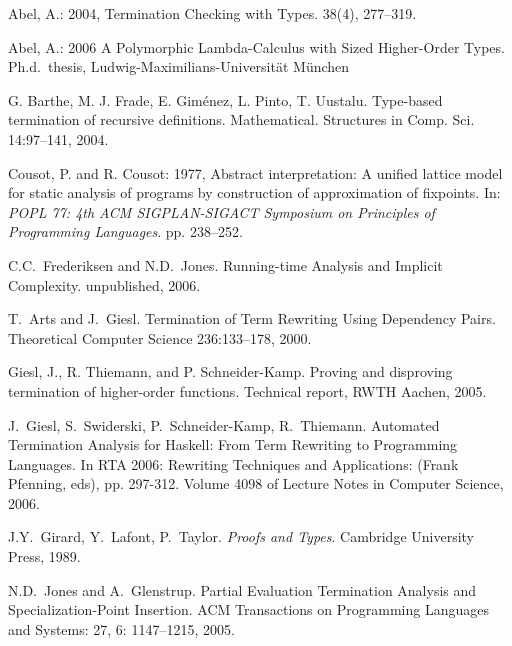 \documentclass{LMCS}
\theoremstyle{definition}\newtheorem{env}[thm]{Environment}
\begin{document}
\nocite{*}


\begin{thebibliography}{MMM}

Abel, A.: 2004, Termination Checking with Types.
 { 38}(4), 277--319.

Abel, A.: 2006 A Polymorphic Lambda-Calculus with Sized Higher-Order
		  Types.
\newblock Ph.d.\ thesis, Ludwig-Maximilians-Universit\"at M\"unchen



G. Barthe, M. J. Frade, E. Gim\'{e}nez, L. Pinto, T. Uustalu.
Type-based termination of recursive definitions. 
Mathematical. Structures in Comp. Sci. 14:97--141, 
2004. 

Cousot, P. and R. Cousot: 1977, Abstract interpretation: A unified lattice
  model for static analysis of programs by construction of approximation of
  fixpoints.
\newblock In: {\em {POPL} 77: 4th {ACM} {SIGPLAN}-{SIGACT} Symposium on
  Principles of Programming Languages}. pp. 238--252.
  
C.C.\ Frederiksen and N.D.\ Jones.
Running-time Analysis and Implicit Complexity.
unpublished, 2006.


T.\ Arts and J.\ Giesl.
Termination of Term Rewriting Using Dependency Pairs. 
{Theoretical Computer Science 236:133--178}, 2000.

Giesl, J., R. Thiemann, and P. Schneider-Kamp.
Proving and disproving
  termination of higher-order functions.
\newblock Technical report, RWTH Aachen, 2005.


J.\ Giesl, S.\ Swiderski,
P.\ Schneider-Kamp, R.\ Thiemann.
Automated Termination Analysis for Haskell: From Term Rewriting
               to Programming Languages. 
In RTA 2006: Rewriting Techniques and Applications:
(Frank Pfenning, eds), 
 pp. 297-312. Volume 4098 of Lecture 
Notes in Computer Science, 2006. 



J.Y.\ Girard, Y.\ Lafont, P.\ Taylor.
{\em Proofs and Types}.
Cambridge University Press, 1989.


N.D.\ Jones and A.\ Glenstrup.
Partial Evaluation Termination Analysis and 
   Specialization-Point Insertion. 
ACM Transactions on Programming Languages and Systems: 27, 6: 1147--1215,
2005. 


\end{thebibliography}
\end{document}

